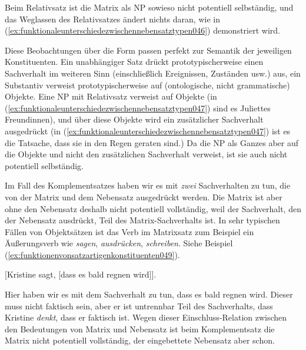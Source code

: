 Beim Relativsatz ist die Matrix als NP sowieso nicht potentiell selbständig, und das Weglassen des Relativsatzes ändert nichts daran, wie in (\ref{ex:funktionaleunterschiedezwischennebensatztypen046}) demonstriert wird.

\begin{exe}
  \ex\label{ex:funktionaleunterschiedezwischennebensatztypen046}
    \begin{xlist}
    \end{xlist}
\end{exe}

Diese Beobachtungen über die Form passen perfekt zur Semantik der jeweiligen Konstituenten.
Ein unabhängiger Satz drückt prototypischerweise einen Sachverhalt im weiteren Sinn (einschließlich Ereignissen, Zuständen usw.) aus, ein Substantiv verweist prototypischerweise auf (ontologische, nicht grammatische) Objekte.
Eine NP mit Relativsatz verweist auf Objekte (in (\ref{ex:funktionaleunterschiedezwischennebensatztypen047}) sind es Juliettes Freundinnen), und über diese Objekte wird ein zusätzlicher Sachverhalt ausgedrückt (in (\ref{ex:funktionaleunterschiedezwischennebensatztypen047}) ist es die Tatsache, dass sie in den Regen geraten sind.)
Da die NP als Ganzes aber auf die Objekte und nicht den zusätzlichen Sachverhalt verweist, ist sie auch nicht potentiell selbständig.

Im Fall des Komplementsatzes haben wir es mit \textit{zwei} Sachverhalten zu tun, die von der Matrix und dem Nebensatz ausgedrückt werden.
Die Matrix ist aber ohne den Nebensatz deshalb nicht potentiell vollständig, weil der Sachverhalt, den der Nebensatz ausdrückt, Teil des Matrix-Sachverhalts ist.
In sehr typischen Fällen von Objektsätzen ist das Verb im Matrixsatz zum Beispiel ein Äußerungsverb wie \textit{sagen}, \textit{ausdrücken}, \textit{schreiben}.
Siehe Beispiel (\ref{ex:funktionenvonsatzartigenkonstituenten049}).

\begin{exe}
  \ex\label{ex:funktionenvonsatzartigenkonstituenten049} [Kristine sagt, [dass es bald regnen wird]].
\end{exe}

Hier haben wir es mit dem Sachverhalt zu tun, dass es bald regnen wird.
Dieser muss nicht faktisch sein, aber er ist untrennbar Teil des Sachverhalts, dass Kristine \textit{denkt}, dass er faktisch ist. 
Wegen dieser Einschluss-Relation zwischen den Bedeutungen von Matrix und Nebensatz ist beim Komplementsatz die Matrix nicht potentiell vollständig, der eingebettete Nebensatz aber schon.

